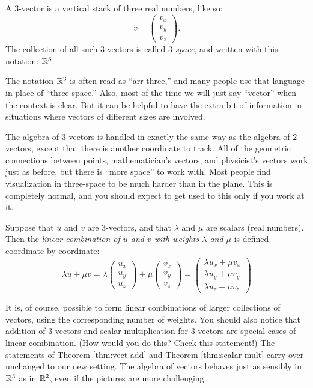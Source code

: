 \documentclass[00-livre-main.tex]{subfiles}
\begin{document}
\begin{definition} 
A $3$-vector is a vertical stack of three real numbers, like so:
\[
v = \begin{pmatrix} v_x\\ v_y \\ v_z\end{pmatrix}.
\]
The collection of all such $3$-vectors is called \emph{$3$-space}, and written with this notation: $\R^3$.
\end{definition}

The notation $\R^3$ is often read as ``arr-three,'' and many people use that language in place of ``three-space.'' Also, most of the time we will just say ``vector'' when the context is clear. But it can be helpful to have the extra bit of information in situations where vectors of different sizes are involved.

The algebra of $3$-vectors is handled in exactly the same way as the algebra of $2$-vectors, except that there is another coordinate to track. All of the geometric connections between points, mathematician's vectors, and physicist's vectors work just as before, but there is ``more space'' to work with. Most people find visualization in three-space to be much harder than in the plane. This is completely normal, and you should expect to get used to this only if you work at it.

\begin{definition}[Algebra in $\R^3$]
Suppose that $u$ and $v$ are $3$-vectors, and that $\lambda$ and $\mu$ are scalars (real numbers). Then the \emph{linear combination of $u$ and $v$ with weights $\lambda$ and $\mu$} is defined coordinate-by-coordinate:
\[
\lambda u + \mu v = \lambda \begin{pmatrix} u_x \\ u_y \\ u_z \end{pmatrix} +
\mu \begin{pmatrix} v_x \\ v_y \\ v_z \end{pmatrix} =  
\begin{pmatrix} \lambda u_x + \mu v_x \\ \lambda  u_y + \mu v_y \\ \lambda u_z + \mu v_z \end{pmatrix} 
\]
\end{definition}

It is, of course, possible to form linear combinations of larger collections of vectors, using the corresponding number of weights. You should also notice that addition of $3$-vectors and scalar multiplication for $3$-vectors are special cases of linear combination. (How would you do this? Check this statement!) The statements of Theorem \ref{thm:vect-add} and Theorem \ref{thm:scalar-mult} carry over unchanged to our new setting. The algebra of vectors behaves just as sensibly in $\R^3$ as in $\mathbb{R}^2$, even if the pictures are more challenging.
\end{document}
